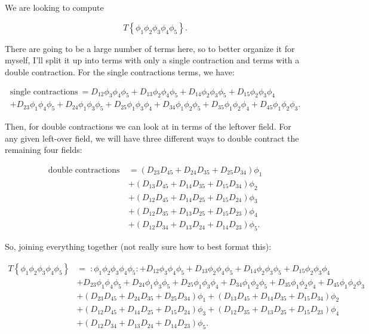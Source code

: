 \section{}

We are looking to compute 

\begin{equation*}
    T\left\{ \phi_1\phi_2\phi_3\phi_4\phi_5 \right\}.
\end{equation*}

There are going to be a large number of terms here, so to better organize it for myself, I'll split it up into terms with only a single contraction and terms with a double contraction. For the single contractions terms, we have:

\newcommand{\PHIthree}[3]{\phi_{#1}\phi_{#2}\phi_{#3}}
\begin{multline*}
    \text{single contractions}\ = D_{12}\PHIthree{3}{4}{5} + D_{13}\PHIthree{2}{4}{5} + D_{14}\PHIthree{2}{3}{5} + D_{15}\PHIthree{2}{3}{4} \\
    + D_{23}\PHIthree{1}{4}{5} + D_{24}\PHIthree{1}{3}{5} + D_{25}\PHIthree{1}{3}{4} + D_{34}\PHIthree{1}{2}{5} + D_{35}\PHIthree{1}{2}{4} + D_{45}\PHIthree{1}{2}{3}.
\end{multline*}

Then, for double contractions we can look at in terms of the leftover field. For any given left-over field, we will have three different ways to double contract the remaining four fields:

\begin{align*}
    \text{double contractions}\ &= (D_{23}D_{45} + D_{24}D_{35} + D_{25}D_{34})\phi_1 \\
    &+ (D_{13}D_{45} + D_{14}D_{35} + D_{15}D_{34})\phi_2 \\
    &+ (D_{12}D_{45} + D_{14}D_{25} + D_{15}D_{24})\phi_3 \\
    &+ (D_{12}D_{35} + D_{13}D_{25} + D_{15}D_{23})\phi_4 \\
    &+ (D_{12}D_{34} + D_{13}D_{24} + D_{14}D_{23})\phi_5.
\end{align*}

So, joining everything together (not really sure how to best format this):

\begin{align}
    T\left\{ \phi_1\phi_2\phi_3\phi_4\phi_5 \right\} &=\; :\phi_1\phi_2\phi_3\phi_4\phi_5: + D_{12}\PHIthree{3}{4}{5} + D_{13}\PHIthree{2}{4}{5} + D_{14}\PHIthree{2}{3}{5} + D_{15}\PHIthree{2}{3}{4} \\
    &+ D_{23}\PHIthree{1}{4}{5} + D_{24}\PHIthree{1}{3}{5} + D_{25}\PHIthree{1}{3}{4} + D_{34}\PHIthree{1}{2}{5} + D_{35}\PHIthree{1}{2}{4} + D_{45}\PHIthree{1}{2}{3} \\
    &+ (D_{23}D_{45} + D_{24}D_{35} + D_{25}D_{34})\phi_1 + (D_{13}D_{45} + D_{14}D_{35} + D_{15}D_{34})\phi_2 \\
    &+ (D_{12}D_{45} + D_{14}D_{25} + D_{15}D_{24})\phi_3 + (D_{12}D_{35} + D_{13}D_{25} + D_{15}D_{23})\phi_4 \\
    &+ (D_{12}D_{34} + D_{13}D_{24} + D_{14}D_{23})\phi_5.
\end{align}